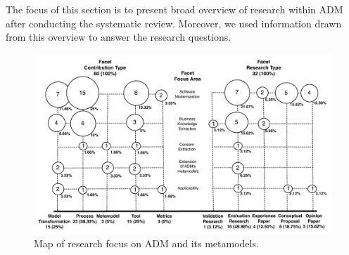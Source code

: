 

The focus of this section is to present broad overview of research within ADM after conducting the systematic review. Moreover, we used information drawn from this overview to answer the research questions. 

\begin{figure}[t]
\centering
  \includegraphics[scale=0.58]{figuras/Nova_Mapa2}
\caption{Map of research focus on ADM and its metamodels.}
\label{map}
\end{figure} 

